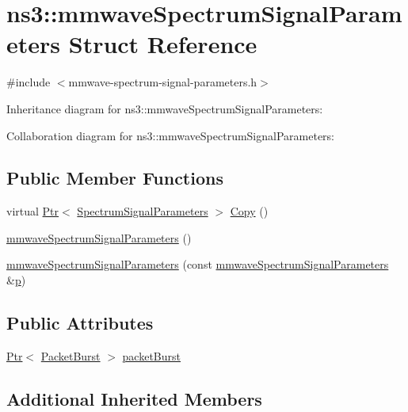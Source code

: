 \hypertarget{structns3_1_1mmwaveSpectrumSignalParameters}{}\section{ns3\+:\+:mmwave\+Spectrum\+Signal\+Parameters Struct Reference}
\label{structns3_1_1mmwaveSpectrumSignalParameters}


{\ttfamily \#include $<$mmwave-\/spectrum-\/signal-\/parameters.\+h$>$}



Inheritance diagram for ns3\+:\+:mmwave\+Spectrum\+Signal\+Parameters\+:


Collaboration diagram for ns3\+:\+:mmwave\+Spectrum\+Signal\+Parameters\+:
\subsection*{Public Member Functions}
\begin{DoxyCompactItemize}
\item 
virtual \hyperlink{classns3_1_1Ptr}{Ptr}$<$ \hyperlink{structns3_1_1SpectrumSignalParameters}{Spectrum\+Signal\+Parameters} $>$ \hyperlink{structns3_1_1mmwaveSpectrumSignalParameters_a1a6475fdea69e79d03b9d623e23e72e2}{Copy} ()
\item 
\hyperlink{structns3_1_1mmwaveSpectrumSignalParameters_a083bbf646d2290a8558e02243854e328}{mmwave\+Spectrum\+Signal\+Parameters} ()
\item 
\hyperlink{structns3_1_1mmwaveSpectrumSignalParameters_ac8652d9729de83b3b1366562bfbb8514}{mmwave\+Spectrum\+Signal\+Parameters} (const \hyperlink{structns3_1_1mmwaveSpectrumSignalParameters}{mmwave\+Spectrum\+Signal\+Parameters} \&\hyperlink{lte__link__budget__x2__handover__measures_8m_ac9de518908a968428863f829398a4e62}{p})
\end{DoxyCompactItemize}
\subsection*{Public Attributes}
\begin{DoxyCompactItemize}
\item 
\hyperlink{classns3_1_1Ptr}{Ptr}$<$ \hyperlink{classns3_1_1PacketBurst}{Packet\+Burst} $>$ \hyperlink{structns3_1_1mmwaveSpectrumSignalParameters_a392695892424ef1623e8c5cdd5b7b455}{packet\+Burst}
\end{DoxyCompactItemize}
\subsection*{Additional Inherited Members}


